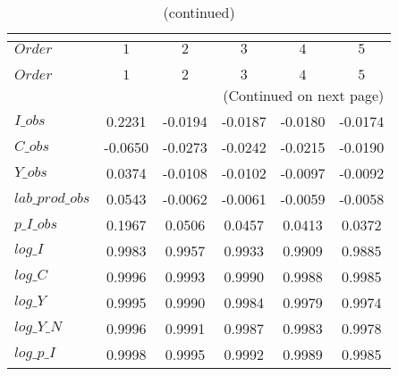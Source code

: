  
\begin{center}
\begin{longtable}{lccccc} 
\caption{COEFFICIENTS OF AUTOCORRELATION}\\
 \label{Table:th_autocorr_matrix}\\
\toprule 
$Order           $	 & 	 $          1$	 & 	 $          2$	 & 	 $          3$	 & 	 $          4$	 & 	 $          5$\\
\midrule \endfirsthead 
\caption{(continued)}\\
 \toprule \\ 
$Order           $	 & 	 $          1$	 & 	 $          2$	 & 	 $          3$	 & 	 $          4$	 & 	 $          5$\\
\midrule \endhead 
\midrule \multicolumn{6}{r}{(Continued on next page)} \\ \bottomrule \endfoot 
\bottomrule \endlastfoot 
$I\_obs          $	 & 	     0.2231	 & 	    -0.0194	 & 	    -0.0187	 & 	    -0.0180	 & 	    -0.0174 \\ 
$C\_obs          $	 & 	    -0.0650	 & 	    -0.0273	 & 	    -0.0242	 & 	    -0.0215	 & 	    -0.0190 \\ 
$Y\_obs          $	 & 	     0.0374	 & 	    -0.0108	 & 	    -0.0102	 & 	    -0.0097	 & 	    -0.0092 \\ 
$lab\_prod\_obs  $	 & 	     0.0543	 & 	    -0.0062	 & 	    -0.0061	 & 	    -0.0059	 & 	    -0.0058 \\ 
$p\_I\_obs       $	 & 	     0.1967	 & 	     0.0506	 & 	     0.0457	 & 	     0.0413	 & 	     0.0372 \\ 
$log\_I          $	 & 	     0.9983	 & 	     0.9957	 & 	     0.9933	 & 	     0.9909	 & 	     0.9885 \\ 
$log\_C          $	 & 	     0.9996	 & 	     0.9993	 & 	     0.9990	 & 	     0.9988	 & 	     0.9985 \\ 
$log\_Y          $	 & 	     0.9995	 & 	     0.9990	 & 	     0.9984	 & 	     0.9979	 & 	     0.9974 \\ 
$log\_Y\_N       $	 & 	     0.9996	 & 	     0.9991	 & 	     0.9987	 & 	     0.9983	 & 	     0.9978 \\ 
$log\_p\_I       $	 & 	     0.9998	 & 	     0.9995	 & 	     0.9992	 & 	     0.9989	 & 	     0.9985 \\ 
\end{longtable}
 \end{center}
